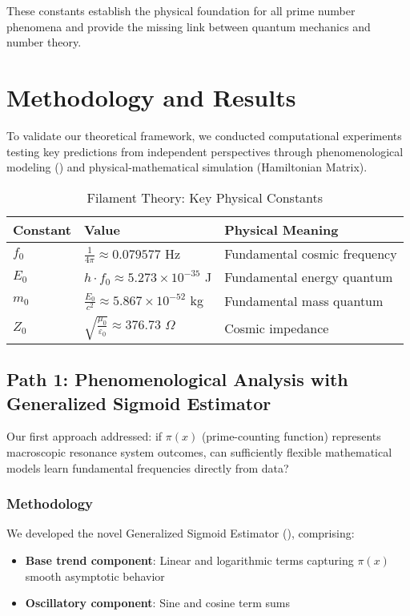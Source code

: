\documentclass[11pt,a4paper]{article}
\newcommand{\GSE}{\text{GSE}}
\begin{document}
These constants establish the physical foundation for all prime number phenomena and provide the missing link between quantum mechanics and number theory.

\section{Methodology and Results}

To validate our theoretical framework, we conducted computational experiments testing key predictions from independent perspectives through phenomenological modeling (\GSE) and physical-mathematical simulation (Hamiltonian Matrix).

\begin{table}[h]
\centering
\caption{Filament Theory: Key Physical Constants}
\begin{tabular}{@{}lll@{}}
\toprule
\textbf{Constant} & \textbf{Value} & \textbf{Physical Meaning} \\
\midrule
$f_0$ & $\frac{1}{4\pi} \approx 0.079577$ Hz & Fundamental cosmic frequency \\
$E_0$ & $h \cdot f_0 \approx 5.273 \times 10^{-35}$ J & Fundamental energy quantum \\
$m_0$ & $\frac{E_0}{c^2} \approx 5.867 \times 10^{-52}$ kg & Fundamental mass quantum \\
$Z_0$ & $\sqrt{\frac{\mu_0}{\varepsilon_0}} \approx 376.73$ $\Omega$ & Cosmic impedance \\
\bottomrule
\end{tabular}
\label{tab:constants}
\end{table}

\subsection{Path 1: Phenomenological Analysis with Generalized Sigmoid Estimator}

Our first approach addressed: if $\pi(x)$ (prime-counting function) represents macroscopic resonance system outcomes, can sufficiently flexible mathematical models learn fundamental frequencies directly from data?

\subsubsection{Methodology}

We developed the novel Generalized Sigmoid Estimator (\GSE), comprising:
\begin{itemize}
\item \textbf{Base trend component}: Linear and logarithmic terms capturing $\pi(x)$ smooth asymptotic behavior
\item \textbf{Oscillatory component}: Sine and cosine term sums
\end{itemize}
\end{document}
